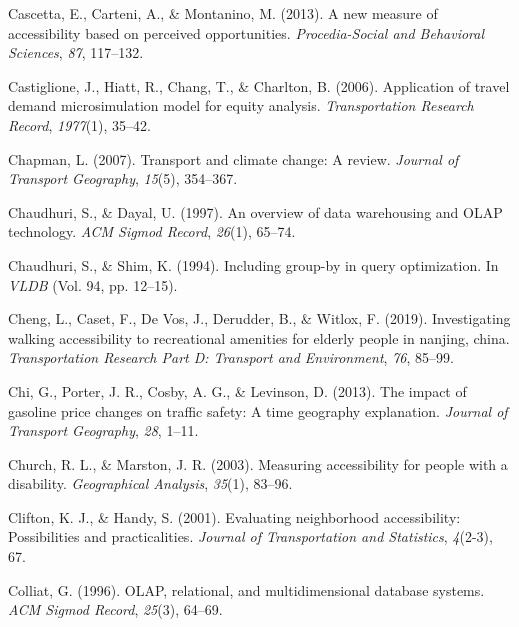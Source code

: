 \documentclass[12pt,twoside]{reedthesis}
\newlength{\cslhangindent}
\newenvironment{CSLReferences}[2] %
 {%
  \setlength{\parindent}{0pt}
  \ifodd #1 \everypar{\setlength{\hangindent}{\cslhangindent}}\ignorespaces\fi
  \ifnum #2 > 0
  \setlength{\parskip}{#2\baselineskip}
  \fi
 }%
 {}
\begin{document}
\begin{CSLReferences}{1}{0}
\leavevmode{}%
Cascetta, E., Carteni, A., \& Montanino, M. (2013). A new measure of accessibility based on perceived opportunities. \emph{Procedia-Social and Behavioral Sciences}, \emph{87}, 117--132.

\leavevmode{}%
Castiglione, J., Hiatt, R., Chang, T., \& Charlton, B. (2006). Application of travel demand microsimulation model for equity analysis. \emph{Transportation Research Record}, \emph{1977}(1), 35--42.

\leavevmode{}%
Chapman, L. (2007). Transport and climate change: A review. \emph{Journal of Transport Geography}, \emph{15}(5), 354--367.

\leavevmode{}%
Chaudhuri, S., \& Dayal, U. (1997). An overview of data warehousing and OLAP technology. \emph{ACM Sigmod Record}, \emph{26}(1), 65--74.

\leavevmode{}%
Chaudhuri, S., \& Shim, K. (1994). Including group-by in query optimization. In \emph{VLDB} (Vol. 94, pp. 12--15).

\leavevmode{}%
Cheng, L., Caset, F., De Vos, J., Derudder, B., \& Witlox, F. (2019). Investigating walking accessibility to recreational amenities for elderly people in nanjing, china. \emph{Transportation Research Part D: Transport and Environment}, \emph{76}, 85--99.

\leavevmode{}%
Chi, G., Porter, J. R., Cosby, A. G., \& Levinson, D. (2013). The impact of gasoline price changes on traffic safety: A time geography explanation. \emph{Journal of Transport Geography}, \emph{28}, 1--11.

\leavevmode{}%
Church, R. L., \& Marston, J. R. (2003). Measuring accessibility for people with a disability. \emph{Geographical Analysis}, \emph{35}(1), 83--96.

\leavevmode{}%
Clifton, K. J., \& Handy, S. (2001). Evaluating neighborhood accessibility: Possibilities and practicalities. \emph{Journal of Transportation and Statistics}, \emph{4}(2-3), 67.

\leavevmode{}%
Colliat, G. (1996). OLAP, relational, and multidimensional database systems. \emph{ACM Sigmod Record}, \emph{25}(3), 64--69.


\end{CSLReferences}
\end{document}
